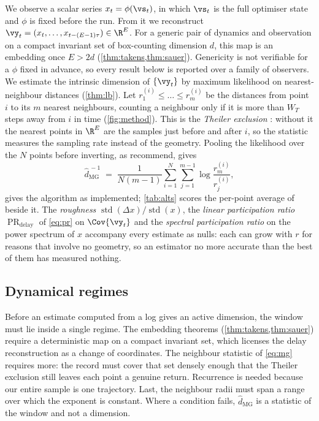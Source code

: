 \documentclass{article}
\DeclareMathOperator{\PR}{PR}
\begin{document}
We observe a scalar series $x_t = \phi(\vs_t)$, in which $\vs_t$ is the full optimiser state and
$\phi$ is fixed before the run. From it we reconstruct
$\vy_t = (x_t, \dots, x_{t-(E-1)\tau}) \in \R^E$. For a
generic pair of dynamics and observation on a compact invariant set of box-counting dimension $d$,
this map is an embedding once $E > 2d$ (\cref{thm:takens,thm:sauer}). Genericity is not verifiable
for a $\phi$ fixed in advance, so every result below is reported over a family of observers. We
estimate the intrinsic dimension of $\{\vy_t\}$ by maximum likelihood on nearest-neighbour
distances (\cref{thm:lb}). Let
$r^{(i)}_1 \le \dots \le r^{(i)}_m$ be the distances from point $i$ to its $m$ nearest neighbours,
counting a neighbour only if it is more than $W_T$ steps away from $i$ in time
(\cref{fig:method}). This is the \emph{Theiler exclusion} \citep{theiler1986spurious,
kantz2004nonlinear}: without it the nearest points in $\R^E$ are the samples just before and after
$i$, so the statistic measures the sampling rate instead of the geometry. Pooling the likelihood over the $N$ points before inverting, as
\citet{mackay2005comments} recommend, gives
\begin{equation}\label{eq:mg}
  \hat{d}_{\mathrm{MG}}^{\,-1} \;=\; \frac{1}{N(m-1)} \sum_{i=1}^{N} \sum_{j=1}^{m-1}
  \log \frac{r^{(i)}_m}{r^{(i)}_j} ,
\end{equation}
 gives the algorithm as implemented; \cref{tab:alts} scores the per-point average of
\citet{levina2004maximum} beside it.
The \emph{roughness} $\operatorname{std}(\Delta x)/\operatorname{std}(x)$, the \emph{linear
participation ratio} $\PR_{\mathrm{delay}}$ of \cref{eq:pr} on $\Cov\{\vy_t\}$ and the
\emph{spectral participation ratio} on the power spectrum of $x$ accompany every estimate as
nulls: each can grow with $r$ for reasons that involve no geometry, so an estimator no more
accurate than the best of them has measured nothing.

\subsection{Dynamical regimes}\label{sec:classes}

Before an estimate computed from a log gives an active dimension, the window must lie inside a
single regime. The embedding theorems
(\cref{thm:takens,thm:sauer}) require a deterministic map on a compact invariant set, which
licenses the delay reconstruction as a change of coordinates. The neighbour statistic of
\cref{eq:mg} requires more: the record must cover that set densely enough that the Theiler
exclusion still leaves each point a genuine return. Recurrence is needed because our entire
sample is one trajectory. Last, the
neighbour radii must span a range over which the exponent is constant. Where a condition fails,
$\hat{d}_{\mathrm{MG}}$ is a statistic of the window and not a dimension.
\end{document}
